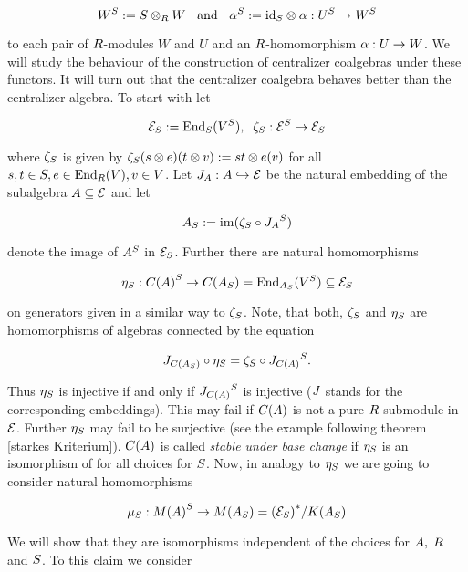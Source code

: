 \documentclass[twoside,12pt]{article}
\begin{document}
\begin{equation} \label{S-Funktor}
{W}^{S}:=S \otimes_{R} W \;\;\mbox{ and } \;\;
 {\alpha}^{S}:={\rm id}_{S} \otimes \alpha:{U}^{S} \rightarrow
{W}^{S}
\end{equation}

to each pair of $R$-modules $W$ and $U$ and an  $R$-homomorphism
$\alpha:U \rightarrow W$. We will study the behaviour of the construction of
centralizer coalgebras under these functors. It will turn out that the
centralizer coalgebra behaves better than the centralizer algebra.
To start with let

\[{{\cal E}}_{S} := {\rm End}_{S}{({V}^{S})},\;\;
{\zeta}_{S}:{{\cal E}}^{S}\rightarrow{{\cal E}}_{S}\]

where ${\zeta}_{S}$ is given by
${\zeta}_{S}(s \otimes e)(t \otimes v):=
st \otimes e(v)$ for all $s,t \in S, e \in {\rm End}_{R}{(V)}, v \in
V$. Let $J_{A}:A\hookrightarrow {\cal E}$ be the natural embedding 
of the subalgebra $A\subseteq {\cal E}$ and let

\[ {A}_{S}:={\rm im}({\zeta}_{S}\circ{J_{A}}^{S})\]

denote the image of ${A}^{S}$ in ${{\cal E}}_{S}$. Further there are
natural homomorphisms

\[{\eta}_{S}: {C(A)}^{S} \rightarrow C({A}_{S})={\rm End}_{{A}_{S}}{({V}^{S})}\subseteq {{\cal E}}_{S}\]

on generators given in a similar way to ${\zeta}_{S}$. Note, that
both, ${\zeta}_{S}$ and ${\eta}_{S}$ are homomorphisms of algebras
connected by the equation

\[ J_{C({A}_{S})}\circ {\eta}_{S}={\zeta}_{S} \circ
{J_{C(A)}}^{S}. \]

Thus ${\eta}_{S}$ is injective
if and only if ${J_{C(A)}}^{S}$ is injective ($J$ stands for the 
corresponding embeddings).  This may fail if $C(A)$
is not a pure $R$-submodule in ${\cal E}$. Further ${\eta}_{S}$ may fail to
be surjective (see the example following theorem \ref{starkes Kriterium}).
$C(A)$ is called {\em stable under base change} if ${\eta}_{S}$ is an
isomorphism of for all choices for $S$. Now, in 
analogy to ${\eta}_{S}$ we are going to consider natural homomorphisms

\[ {\mu}_{S} : {M(A)}^{S} \rightarrow M({A}_{S})={({{\cal E}}_{S})}^*/K({A}_{S})\]

We will show that they are isomorphisms independent of the choices for $A,\; R$ and $S$.
To this claim we consider
\end{document}
